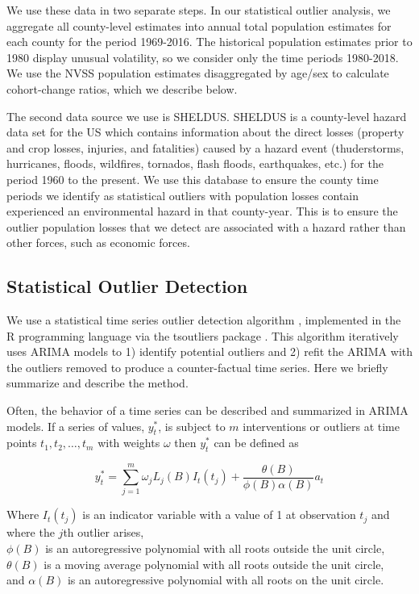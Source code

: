\documentclass[12pt]{article}
\begin{document}
We use these data in two separate steps. In our statistical outlier
analysis, we aggregate all county-level estimates into annual total
population estimates for each county for the period 1969-2016. The
historical population estimates prior to 1980 display unusual
volatility, so we consider only the time periods 1980-2018. We use the
NVSS population estimates disaggregated by age/sex to calculate
cohort-change ratios, which we describe below.

The second data source we use is SHELDUS. SHELDUS is a county-level
hazard data set for the US which contains information about the direct
losses (property and crop losses, injuries, and fatalities) caused by a
hazard event (thuderstorms, hurricanes, floods, wildfires, tornados,
flash floods, earthquakes, etc.) for the period 1960 to the present. We
use this database to ensure the county time periods we identify as
statistical outliers with population losses contain experienced an
environmental hazard in that county-year. This is to ensure the outlier
population losses that we detect are associated with a hazard rather
than other forces, such as economic forces.

\hypertarget{statistical-outlier-detection}{%
\subsection{Statistical Outlier
Detection}\label{statistical-outlier-detection}}

We use a statistical time series outlier detection algorithm
\citep{chen1993joint}, implemented in the R programming language
\citep{rcore} via the tsoutliers package \citep{tsoutliers2019}. This
algorithm iteratively uses ARIMA models to 1) identify potential
outliers and 2) refit the ARIMA with the outliers removed to produce a
counter-factual time series. Here we briefly summarize and describe the
method.

Often, the behavior of a time series can be described and summarized in
ARIMA models. If a series of values, \(y_t^*\), is subject to \(m\)
interventions or outliers at time points \(t_1,t_2,…,t_m\) with weights
\(\omega\) then \(y_t^*\) can be defined as

\begin{equation}
\label{eq:arima}
y_t^* = \sum_{j=1}^{m} \omega_jL_j(B)I_t(t_j) + \frac{\theta(B)}{\phi(B)\alpha(B)}a_t 
\end{equation}

Where \(I_t(t_j)\) is an indicator variable with a value of 1 at
observation \(t_j\) and where the \(j\)th outlier arises,\\
\(\phi(B)\) is an autoregressive polynomial with all roots outside the
unit circle,\\
\(\theta(B)\) is a moving average polynomial with all roots outside the
unit circle,\\
and \(\alpha(B)\) is an autoregressive polynomial with all roots on the
unit circle.
\end{document}
